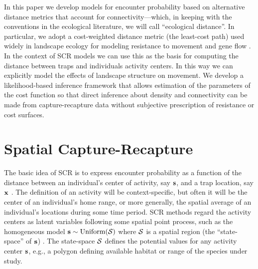 \documentclass[12pt]{article}
\begin{document}
\begin{spacing}{1.8}
In this paper we develop models for encounter probability based on
alternative distance metrics that account for
connectivity---which, in keeping with the conventions in the
ecological literature, we will call ``ecological distance''. In
particular, we adopt a cost-weighted distance metric (the least-cost path)
used widely in landscape ecology for modeling resistance to movement
and gene flow \citep{adriaensen_etal:2003}. In the
context of SCR models we can use this as the basis for computing the
distance between traps and individuals activity centers. In this way
we can explicitly model the effects of %
landscape structure on movement.
We develop a likelihood-based inference framework that allows
estimation of the parameters of the cost function
so that direct inference about density and connectivity can be made
from capture-recapture data without subjective prescription
of resistance or cost surfaces.


\section{Spatial Capture-Recapture}

The basic idea of SCR is to express encounter probability %
as a function of the distance between an individual's center of
activity, say ${\bf s}$, and a trap location, say ${\bf x}$ \citep{borchers_efford:2008}. The
definition of an activity will be context-specific, but often it will
be the center of an individual's home range, or more generally, the
spatial average of an individual's locations during some time
period. SCR methods regard the activity centers as latent variables
following some spatial point process, such as the homogeneous
model ${\bf s} \sim \mbox{Uniform}({\cal
  S})$ where ${\cal S}$ is a spatial region (the ``state-space'' of
${\bf s}$)
\citep{royle_young:2008}.
The state-space ${\cal S}$
defines the potential values for any activity center ${\bf s}$, e.g.,
a polygon defining available habitat or range of the species under study.


\end{spacing}
\end{document}
